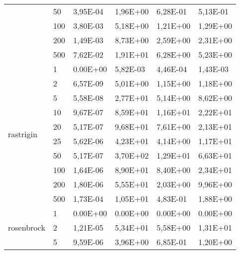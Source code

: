 \begin{longtable}[c]{|m{3.5cm}|l|l|l|l|l|}
                                        & 50        & 3,95E-04   & 1,96E+00   & 6,28E-01   & 5,13E-01  \\ \cline{2-6} 
                                        & 100       & 3,80E-03   & 5,18E+00   & 1,21E+00   & 1,29E+00  \\ \cline{2-6} 
                                        & 200       & 1,49E-03   & 8,73E+00   & 2,59E+00   & 2,31E+00  \\ \cline{2-6} 
                                        & 500       & 7,62E-02   & 1,91E+01   & 6,28E+00   & 5,23E+00  \\ \hline
\multirow{10}{*}{rastrigin}             & 1         & 0.00E+00   & 5,82E-03   & 4,46E-04   & 1,43E-03  \\ \cline{2-6} 
                                        & 2         & 6,57E-09   & 5,01E+00   & 1,15E+00   & 1,18E+00  \\ \cline{2-6} 
                                        & 5         & 5,58E-08   & 2,77E+01   & 5,14E+00   & 8,62E+00  \\ \cline{2-6} 
                                        & 10        & 9,67E-07   & 8,59E+01   & 1,16E+01   & 2,22E+01  \\ \cline{2-6} 
                                        & 20        & 5,17E-07   & 9,68E+01   & 7,61E+00   & 2,13E+01  \\ \cline{2-6} 
                                        & 25        & 5,62E-06   & 4,23E+01   & 4,14E+00   & 1,17E+01  \\ \cline{2-6} 
                                        & 50        & 5,17E-07   & 3,70E+02   & 1,29E+01   & 6,63E+01  \\ \cline{2-6} 
                                        & 100       & 1,64E-06   & 8,90E+01   & 8,40E+00   & 2,34E+01  \\ \cline{2-6} 
                                        & 200       & 1,80E-06   & 5,55E+01   & 2,03E+00   & 9,96E+00  \\ \cline{2-6} 
                                        & 500       & 1,73E-04   & 1,05E+01   & 4,83E-01   & 1,88E+00  \\ \hline
\multirow{10}{*}{rosenbrock}            & 1         & 0.00E+00   & 0.00E+00   & 0.00E+00   & 0.00E+00  \\ \cline{2-6} 
                                        & 2         & 1,21E-05   & 5,34E+01   & 5,58E+00   & 1,31E+01  \\ \cline{2-6} 
                                        & 5         & 9,59E-06   & 3,96E+00   & 6,85E-01   & 1,20E+00  \\ \cline{2-6} 

\end{longtable}
